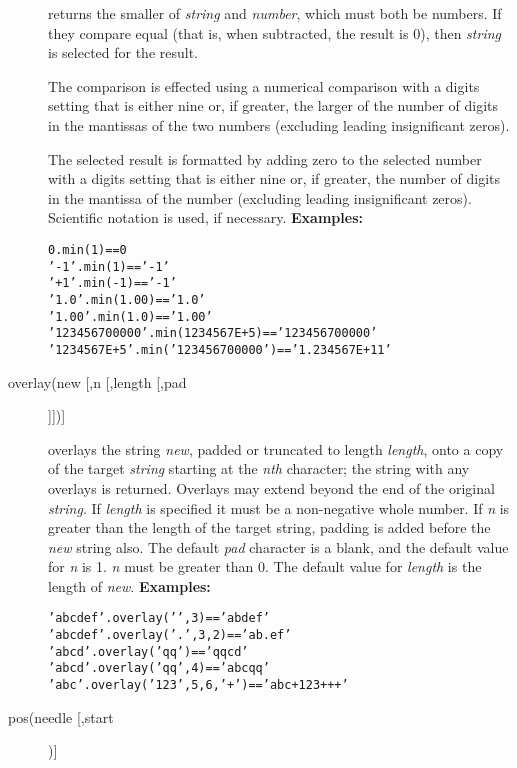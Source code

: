 \begin{description}
returns the smaller of \emph{string} and \emph{number}, which
must both be numbers.  If they compare equal (that is, when subtracted,
the result is 0), then \emph{string} is selected for the result.
 
The comparison is effected using a numerical comparison with a digits
setting that is either nine or, if greater, the larger of the number of
digits in the mantissas of the two numbers (excluding leading
insignificant zeros).
 
The selected result is formatted by adding zero to the selected number
with a digits setting that is either nine or, if greater, the number of
digits in the mantissa of the number (excluding leading insignificant
zeros).
Scientific notation is used, if necessary.
 \textbf{Examples:}
\begin{alltt}
0.min(1)          ==0
'-1'.min(1)       =='-1'
'+1'.min(-1)      =='-1'
'1.0'.min(1.00)   =='1.0'
'1.00'.min(1.0)   =='1.00'
'123456700000'.min(1234567E+5)   == '123456700000'
'1234567E+5'.min('123456700000') == '1.234567E+11'
\end{alltt}
\item[overlay(new [,n [,length [,pad]]])]\label{refoverlay}

overlays the string \emph{new}, padded or truncated to length
\emph{length}, onto a copy of the target \emph{string} starting
at the \emph{n}\emph{th} character; the string with any overlays is
returned.  Overlays may extend beyond the end of the original
\emph{string}.
If \emph{length} is specified it must be a non-negative whole
number.
If \emph{n} is greater than the length of
the target string, padding is added before the \emph{new} string
also.
The default \emph{pad} character is a blank, and the default value
for \emph{n} is 1.
\emph{n} must be greater than 0.
The default value for \emph{length} is the length of \emph{new}.
 \textbf{Examples:}
\begin{alltt}
'abcdef'.overlay(' ',3)      == 'ab def'
'abcdef'.overlay('.',3,2)    == 'ab. ef'
'abcd'.overlay('qq')         == 'qqcd'
'abcd'.overlay('qq',4)       == 'abcqq'
'abc'.overlay('123',5,6,'+') == 'abc+123+++'
\end{alltt}
\item[pos(needle [,start])]\label{refpos}


\end{description}
